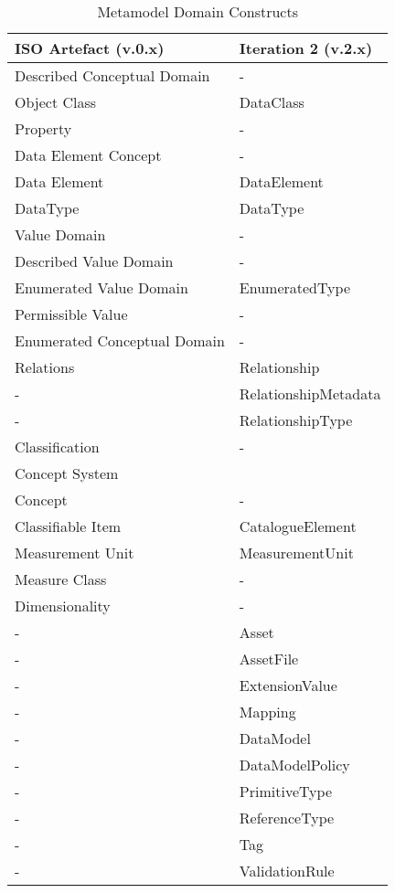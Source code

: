 \documentclass[runningheads]{llncs}
\begin{document}
	\begin{table}[h]
		\begin{center}
			\caption{Metamodel Domain Constructs}
			\label{tab:metamodelconstructs}
			\begin{tabular}{ p{3cm} | p{3cm}  } 
				\textbf{ISO Artefact (v.0.x)} &  \textbf{Iteration 2 (v.2.x)} \\
				\hline
				Described Conceptual Domain &   -  \\ 
				\hline
				Object Class &  DataClass     \\ 
				\hline
				Property &   -   \\ 
				\hline
				Data Element Concept &   -   \\
				\hline
				Data Element &    DataElement \\
				\hline
				DataType &  DataType  \\
				\hline
				Value Domain &   -\\
				\hline
				Described Value Domain &  -    \\
				\hline
				Enumerated Value Domain &   EnumeratedType    \\
				\hline
				Permissible Value &  -  \\
				\hline
				Enumerated Conceptual Domain &  -    \\
				\hline
				Relations & Relationship   \\
				\hline
				- &  RelationshipMetadata \\
				\hline
				- &  RelationshipType \\
				\hline
				Classification &  - \\
				\hline
				Concept System  &    \\
				\hline
				Concept  & -   \\
				\hline
				Classifiable Item & CatalogueElement  \\
				\hline
				Measurement Unit & MeasurementUnit \\
				\hline
				Measure Class &   -  \\
				\hline
				Dimensionality &   -  \\
				\hline
				- & Asset \\
				\hline
				- & AssetFile \\
				\hline
				- &   ExtensionValue  \\
				\hline
				-  & Mapping  \\
				\hline
				- &  DataModel  \\
				\hline
				- &   DataModelPolicy \\
				\hline
				- &   PrimitiveType \\
				\hline
				- &   ReferenceType \\
				\hline
				- &   Tag \\
				\hline
				- &   ValidationRule \\
			\end{tabular}
		\end{center}
	\end{table}
	
\end{document}
